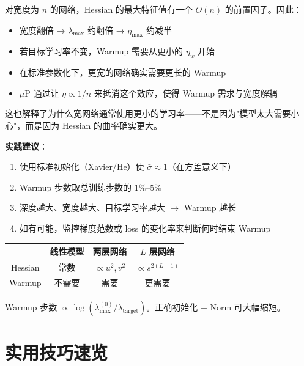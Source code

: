 \documentclass[12pt, a4paper]{ctexart}
\begin{document}
\begin{keypoint}[宽度增大曲率]
对宽度为 $n$ 的网络，Hessian 的最大特征值有一个 $O(n)$ 的前置因子。因此：
\begin{itemize}
    \item 宽度翻倍 → $\lambda_{\max}$ 约翻倍 → $\eta_{\max}$ 约减半
    \item 若目标学习率不变，Warmup 需要从更小的 $\eta_w$ 开始
    \item 在标准参数化下，更宽的网络确实需要更长的 Warmup
    \item $\mu$P 通过让 $\eta \propto 1/n$ 来抵消这个效应，使得 Warmup 需求与宽度解耦
\end{itemize}
这也解释了为什么宽网络通常使用更小的学习率——不是因为"模型太大需要小心"，而是因为 Hessian 的曲率确实更大。
\end{keypoint}

\textbf{实践建议}：
\begin{enumerate}
    \item 使用标准初始化（Xavier/He）使 $\bar{\sigma} \approx 1$（在方差意义下）
    \item Warmup 步数取总训练步数的 $1\%$--$5\%$
    \item 深度越大、宽度越大、目标学习率越大 $\to$ Warmup 越长
    \item 如有可能，监控梯度范数或 loss 的变化率来判断何时结束 Warmup
\end{enumerate}

\begin{keypoint}
\begin{center}
\begin{tabular}{c|ccc}
 & 线性模型 & 两层网络 & $L$ 层网络 \\
\hline
Hessian & 常数 & $\propto u^2,v^2$ & $\propto s^{2(L-1)}$ \\
Warmup & 不需要 & 需要 & 更需要 \\
\end{tabular}
\end{center}

Warmup 步数 $\propto \log(\lambda_{\max}^{(0)}/\lambda_{\text{target}})$。正确初始化 + Norm 可大幅缩短。
\end{keypoint}


\section{实用技巧速览}
\end{document}
